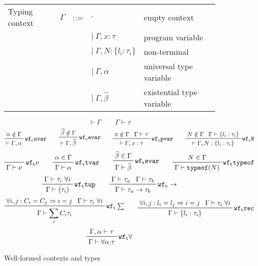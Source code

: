 \documentclass[letterpaper]{article}
\newcommand{\utv}{\alpha}             %
\newcommand{\etv}{\widehat{\beta}}    %
\begin{document}
\begin{figure}
  \begin{tabular}{l c l l l}
    Typing context            & $\Gamma$ & ::= & $ \cdot $                       & empty context \\
                              &          &     & $|\ \Gamma, x: \tau $           & program variable \\
                              &          &     & $|\ \Gamma, N: \{l_i:\tau_i\} $ & non-terminal \\
                              &          &     & $|\ \Gamma, \utv $              & universal type variable \\
                              &          &     & $|\ \Gamma, \etv  $             & existential type variable\\
  \end{tabular}
  $$ $$
  $$ \boxed{\vdash\Gamma} \qquad \boxed{\Gamma\vdash\tau} $$
  $$ \prftree[r]{$\mathtt{wf_c uvar}$}{\prfassumption{\utv\notin\Gamma}}
             {\vdash\Gamma, \utv}\qquad
     \prftree[r]{$\mathtt{wf_c evar}$}{\prfassumption{\etv\notin\Gamma}}
             {\vdash\Gamma, \etv}\qquad
     \prftree[r]{$\mathtt{wf_c pvar}$}{\prfassumption{x\notin\Gamma}}{\prfassumption{\Gamma\vdash\tau}}
             {\vdash\Gamma, x:\tau}\qquad
     \prftree[r]{$\mathtt{wf_c N}$}{\prfassumption{N\notin\Gamma}}{\prfassumption{\Gamma\vdash\{l_i:\tau_i\}}}
             {\vdash\Gamma, N:\{l_i:\tau_i\}} $$
  $$ \prfbyaxiom{$\mathtt{wf_t \nu}$}{\Gamma\vdash\nu}\qquad
     \prftree[r]{$\mathtt{wf_t tvar}$}{\prfassumption{\utv\in\Gamma}}
             {\Gamma\vdash\utv}\qquad
     \prftree[r]{$\mathtt{wf_t evar}$}{\prfassumption{\etv\in\Gamma}}
             {\Gamma\vdash\etv}\qquad
     \prftree[r]{$\mathtt{wf_t typeof}$}{\prfassumption{N\in\Gamma}}
             {\Gamma\vdash\texttt{typeof}(N)} $$
  $$ \prftree[r]{$\mathtt{wf_t tup}$}{\prfassumption{\Gamma\vdash\tau_i\ \forall i}}
             {\Gamma\vdash(\tau_i)}\qquad
     \prftree[r]{$\mathtt{wf_t \rightarrow}$}{\prfassumption{\Gamma\vdash\tau_a}}{\prfassumption{\Gamma\vdash\tau_b}}
             {\Gamma\vdash\tau_a\rightarrow\tau_b} $$
  $$ \prftree[r]{$\mathtt{wf_t \sum}$}{\prfassumption{\forall i,j:C_i=C_j\Rightarrow i=j}}
             {\prfassumption{\Gamma\vdash\tau_i\ \forall i}}
             {\Gamma\vdash\sum_i C_i\tau_i}\qquad
     \prftree[r]{$\mathtt{wf_t rec}$}{\prfassumption{\forall i,j:l_i=l_j\Rightarrow i=j}}
             {\prfassumption{\Gamma\vdash\tau_i\ \forall i}}
             {\Gamma\vdash\{l_i:\tau_i\}} $$
  $$ \prftree[r]{$\mathtt{wf_t \forall}$}{\prfassumption{\Gamma,\utv\vdash\tau}}
             {\Gamma\vdash\forall\utv.\tau} $$
  \caption{Well-formed contexts and types}
  \label{f:ctxt}
\end{figure}
\end{document}
